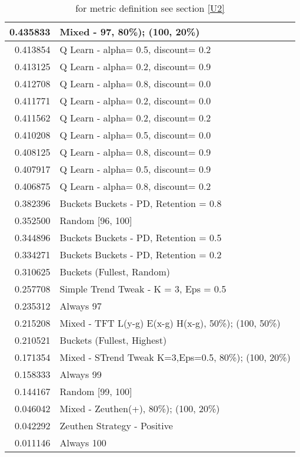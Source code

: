 \begin{table}[!hbtp]
\begin{footnotesize}
\begin{tabular}{|r|l|}
0.435833 & Mixed - {97, 80\%); (100, 20\%)}\\ \hline
0.413854 & Q Learn - alpha= 0.5, discount= 0.2\\ \hline
0.413125 & Q Learn - alpha= 0.2, discount= 0.9\\ \hline
0.412708 & Q Learn - alpha= 0.8, discount= 0.0\\ \hline
0.411771 & Q Learn - alpha= 0.2, discount= 0.0\\ \hline
0.411562 & Q Learn - alpha= 0.2, discount= 0.2\\ \hline
0.410208 & Q Learn - alpha= 0.5, discount= 0.0\\ \hline
0.408125 & Q Learn - alpha= 0.8, discount= 0.9\\ \hline
0.407917 & Q Learn - alpha= 0.5, discount= 0.9\\ \hline
0.406875 & Q Learn - alpha= 0.8, discount= 0.2\\ \hline
0.382396 & Buckets Buckets - PD, Retention = 0.8\\ \hline
0.352500 & Random [96, 100]\\ \hline
0.344896 & Buckets Buckets - PD, Retention = 0.5\\ \hline
0.334271 & Buckets Buckets - PD, Retention = 0.2\\ \hline
0.310625 & Buckets (Fullest, Random)\\ \hline
0.257708 & Simple Trend Tweak - K = 3, Eps = 0.5\\ \hline
0.235312 & Always 97\\ \hline
0.215208 & Mixed - {TFT L(y-g) E(x-g) H(x-g), 50\%); (100, 50\%)}\\ \hline
0.210521 & Buckets (Fullest, Highest)\\ \hline
0.171354 & Mixed - {STrend Tweak K=3,Eps=0.5, 80\%); (100, 20\%)}\\ \hline
0.158333 & Always 99\\ \hline
0.144167 & Random [99, 100]\\ \hline
0.046042 & Mixed - {Zeuthen(+), 80\%); (100, 20\%)}\\ \hline
0.042292 & Zeuthen Strategy - Positive\\ \hline
0.011146 & Always 100\\ \hline
\end{tabular}
\caption{for metric definition see section \eqref{U2}}
\end{footnotesize}
\end{table}

